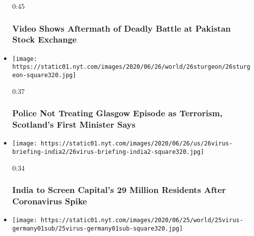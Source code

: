 \begin{itemize}
  0:45

  \hypertarget{video-shows-aftermath-of-deadly-battle-at-pakistan-stock-exchange}{%
  \subsubsection{Video Shows Aftermath of Deadly Battle at Pakistan
  Stock
  Exchange}\label{video-shows-aftermath-of-deadly-battle-at-pakistan-stock-exchange}}
\item
  \href{https://www.nytimes.com/video/us/100000007212234/nicola-sturgeon-glasgow-attack.html?action=click\&module=video-series-bar\&region=header\&pgtype=Article\&playlistId=video/world}{}

  \texttt{[image: https://static01.nyt.com/images/2020/06/26/world/26sturgeon/26sturgeon-square320.jpg]}

  0:37

  \hypertarget{police-not-treating-glasgow-episode-as-terrorism-scotlands-first-minister-says}{%
  \subsubsection{Police Not Treating Glasgow Episode as Terrorism,
  Scotland's First Minister
  Says}\label{police-not-treating-glasgow-episode-as-terrorism-scotlands-first-minister-says}}
\item
  \href{https://www.nytimes.com/video/us/100000007212150/new-delhi-coronavirus-tests.html?action=click\&module=video-series-bar\&region=header\&pgtype=Article\&playlistId=video/world}{}

  \texttt{[image: https://static01.nyt.com/images/2020/06/26/us/26virus-briefing-india2/26virus-briefing-india2-square320.jpg]}

  0:34

  \hypertarget{india-to-screen-capitals-29-million-residents-after-coronavirus-spike}{%
  \subsubsection{India to Screen Capital's 29 Million Residents After
  Coronavirus
  Spike}\label{india-to-screen-capitals-29-million-residents-after-coronavirus-spike}}
\item
  \href{https://www.nytimes.com/video/us/100000007210500/germany-spike-coronavirus-cases.html?action=click\&module=video-series-bar\&region=header\&pgtype=Article\&playlistId=video/world}{}

  \texttt{[image: https://static01.nyt.com/images/2020/06/25/world/25virus-germany01sub/25virus-germany01sub-square320.jpg]}


\end{itemize}
